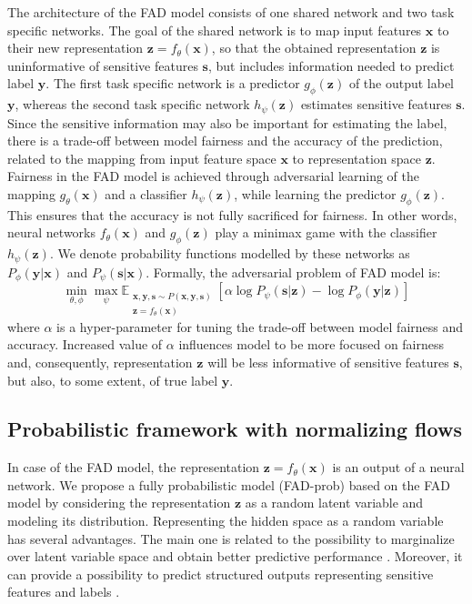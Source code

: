 \documentclass[preprint,12pt]{elsarticle}
\begin{document}
The architecture of the FAD model consists of one shared network and two task specific networks. The goal of the shared network is to map input features $\mathbf{x}$ to their new representation $\mathbf{z}=f_\theta(\mathbf{x})$, so that the obtained representation $\mathbf{z}$ is uninformative of sensitive features $\mathbf{s}$, but includes information needed to predict label $\mathbf{y}$. The first task specific network is a predictor $g_\phi(\mathbf{z})$ of the output label $\mathbf{y}$, whereas the second task specific network $h_\psi(\mathbf{z})$ estimates sensitive features $\mathbf{s}$. Since the sensitive information may also be important for estimating the label, there is a trade-off between model fairness and the accuracy of the prediction, related to the mapping from input feature space $\mathbf{x}$ to representation space $\mathbf{z}$.
Fairness in the FAD model is achieved through adversarial learning of the mapping $g_\theta(\mathbf{x})$ and a classifier $h_\psi(\mathbf{z})$, while learning the predictor $g_\phi(\mathbf{z})$. This ensures that the accuracy is not fully sacrificed for fairness. In other words, neural networks $f_\theta(\mathbf{x})$ and $g_\phi(\mathbf{z})$ play a minimax game with the classifier $h_\psi(\mathbf{z})$. We denote probability functions modelled by these networks as $P_\phi(\mathbf{y}|\mathbf{x})$ and $P_\psi(\mathbf{s}|\mathbf{x})$. Formally, the adversarial problem of FAD model is:
$$\min_{\theta,\phi}\max_{\psi} \mathbb{E}_{\substack{\mathbf{x},\mathbf{y},\mathbf{s} \sim P(\mathbf{x},\mathbf{y},\mathbf{s})\\\mathbf{z}=f_\theta(\mathbf{x})}} \left[\alpha\log P_{\psi}(\mathbf{s}|\mathbf{z}) - \log P_{\phi}(\mathbf{y}|\mathbf{z})\right]$$
where $\alpha$ is a hyper-parameter for tuning the trade-off between model fairness and accuracy. Increased value of $\alpha$ influences model to be more focused on fairness and, consequently, representation $\mathbf{z}$ will be less informative of sensitive features $\mathbf{s}$, but also, to some extent, of true label $\mathbf{y}$.

\subsection{Probabilistic framework with normalizing flows}
\label{Sec:advenet-nf}
In case of the FAD model, the representation $\mathbf{z}=f_\theta(\mathbf{x})$ is an output of a neural network. We propose a fully probabilistic model (FAD-prob) based on the FAD model by considering the representation $\mathbf{z}$ as a random latent variable and modeling its distribution. Representing the hidden space as a random variable has several advantages. The main one is related to the possibility to marginalize over latent variable space and obtain better predictive performance \cite{tan2010social}. Moreover, it can provide a possibility to predict structured outputs representing sensitive features and labels \cite{koller2009probabilistic}.
\end{document}
